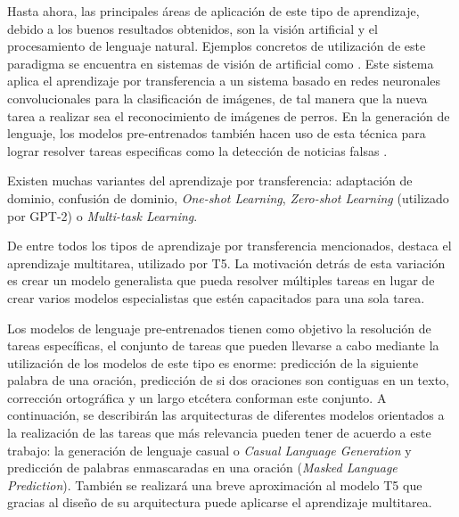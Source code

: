 Hasta ahora, las principales áreas de aplicación de este tipo de aprendizaje, debido a los buenos resultados obtenidos, son la visión artificial y el procesamiento de lenguaje natural. Ejemplos concretos de utilización de este paradigma se encuentra en sistemas de visión de artificial como \citep{xinyuan2018}. Este sistema aplica el aprendizaje por transferencia a un sistema basado en redes neuronales convolucionales para la clasificación de imágenes, de tal manera que la nueva tarea a realizar sea el reconocimiento de imágenes de perros. En la generación de lenguaje, los modelos pre-entrenados también hacen uso de esta técnica para lograr resolver tareas especificas como la detección de noticias falsas \citep{slovikovskaya2019transfer}.

Existen muchas variantes del aprendizaje por transferencia: adaptación de dominio, confusión de dominio, \textit{One-shot Learning}, \textit{Zero-shot Learning} (utilizado por GPT-2) o \textit{Multi-task Learning}. 


De entre todos los tipos de aprendizaje por transferencia mencionados, destaca el aprendizaje multitarea, utilizado por T5. La motivación detrás de esta variación es crear un modelo generalista que pueda resolver múltiples tareas en lugar de crear varios modelos especialistas que estén capacitados para una sola tarea.


Los modelos de lenguaje pre-entrenados tienen como objetivo la resolución de tareas específicas, el conjunto de tareas que pueden llevarse a cabo mediante la utilización de los modelos de este tipo es enorme: predicción de la siguiente palabra de una oración, predicción de si dos oraciones son contiguas en un texto, corrección ortográfica y un largo etcétera conforman este conjunto. A continuación, se describirán las arquitecturas de diferentes modelos orientados a la realización de las tareas que más relevancia pueden tener de acuerdo a este trabajo: la generación de lenguaje casual o \textit{Casual Language Generation} y predicción de palabras enmascaradas en una oración (\textit{Masked Language Prediction}). También se realizará una breve aproximación al modelo T5 que gracias al diseño de su arquitectura puede aplicarse el aprendizaje multitarea.

